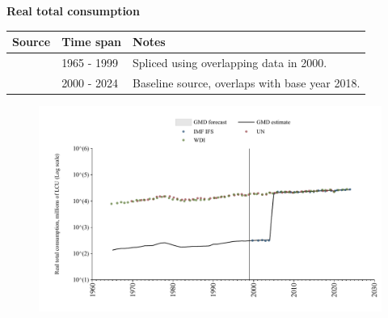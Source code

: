 \documentclass[12pt,a4paper,landscape]{article}
\begin{document}
\begin{adjustbox}{max totalsize={\paperwidth}{\paperheight},center}
\begin{minipage}[t][\textheight][t]{\textwidth}
\vspace*{0.5cm}
{}
\begin{center}
{\Large\bfseries Real total consumption}
\end{center}
\vspace{0.5cm}
\begin{table}[H]
\centering
\small
\begin{tabular}{|l|l|l|}
\hline
\textbf{Source} & \textbf{Time span} & \textbf{Notes} \\
\hline
\rowcolor{white}\cite{WDI}& 1965 - 1999 &Spliced using overlapping data in 2000. \\
\rowcolor{lightgray}\cite{IMF_IFS}& 2000 - 2024 &Baseline source, overlaps with base year 2018. \\
\hline
\end{tabular}
\end{table}
\begin{figure}[H]
\centering
\includegraphics[width=\textwidth,height=0.6\textheight,keepaspectratio]{graphs/SLV_rcons.pdf}
\end{figure}
\end{minipage}
\end{adjustbox}
\end{document}
